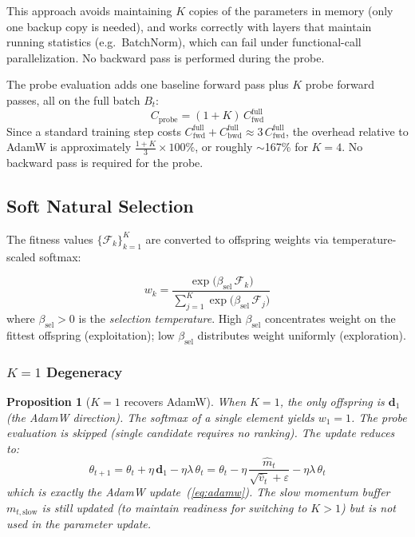 \documentclass[12pt]{article}
\newcommand{\eqbox}[2]{%
  \begin{tcolorbox}[eqstyle, title={#1}]
    #2
  \end{tcolorbox}
}
\newtheorem{proposition}{Proposition}
\begin{document}
This approach avoids maintaining $K$ copies of the parameters in memory
(only one backup copy is needed), and works correctly with layers that
maintain running statistics (e.g.\ BatchNorm), which can fail under
functional-call parallelization.
No backward pass is performed during the probe.

\eqbox{Proposition 1 --- Computational Cost}{
The probe evaluation adds one baseline forward pass plus $K$ probe
forward passes, all on the full batch $B_t$:
\begin{equation}
  C_{\mathrm{probe}} = (1 + K)\,C_{\mathrm{fwd}}^{\mathrm{full}}
  \label{eq:probe_cost}
\end{equation}
\smallskip
Since a standard training step costs
$C_{\mathrm{fwd}}^{\mathrm{full}} + C_{\mathrm{bwd}}^{\mathrm{full}}
\approx 3\,C_{\mathrm{fwd}}^{\mathrm{full}}$,
the overhead relative to AdamW is approximately
$\frac{1+K}{3} \times 100\%$, or roughly $\sim$167\% for $K = 4$.
No backward pass is required for the probe.
}


\subsection{Soft Natural Selection}
\label{ssec:selection}

The fitness values $\{\mathcal{F}_k\}_{k=1}^K$ are converted to
offspring weights via temperature-scaled softmax:

\eqbox{Definition 3 --- Offspring Selection Weights}{
\begin{equation}
  w_k = \frac{
    \exp\!\bigl(\beta_{\mathrm{sel}}\,\mathcal{F}_k\bigr)
  }{
    \sum_{j=1}^{K}
    \exp\!\bigl(\beta_{\mathrm{sel}}\,\mathcal{F}_j\bigr)
  }
  \label{eq:selection_weights}
\end{equation}
\smallskip
where $\beta_{\mathrm{sel}} > 0$ is the \emph{selection temperature}.
High $\beta_{\mathrm{sel}}$ concentrates weight on the fittest offspring
(exploitation); low $\beta_{\mathrm{sel}}$ distributes weight uniformly
(exploration).
}

\subsubsection{$K = 1$ Degeneracy}

\begin{proposition}[$K = 1$ recovers AdamW]
\label{prop:k1}
When $K = 1$, the only offspring is $\mathbf{d}_1$ (the AdamW direction).
The softmax of a single element yields $w_1 = 1$.
The probe evaluation is skipped (single candidate requires no ranking).
The update reduces to:
\begin{equation}
  \theta_{t+1} = \theta_t + \eta\,\mathbf{d}_1 - \eta\lambda\,\theta_t
  = \theta_t - \eta\,\frac{\hat{m}_t}{\sqrt{\hat{v}_t} + \varepsilon}
    - \eta\lambda\,\theta_t
  \label{eq:k1_adam}
\end{equation}
which is exactly the AdamW update~(\cref{eq:adamw}).
The slow momentum buffer $m_{t,\mathrm{slow}}$ is still updated
(to maintain readiness for switching to $K > 1$) but is not used
in the parameter update.
\end{proposition}
\end{document}
